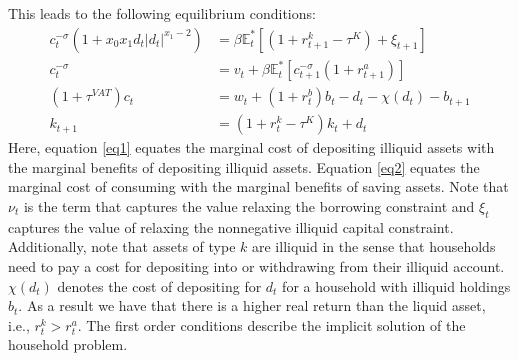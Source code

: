 This leads to the following equilibrium conditions:
\begin{align}
    c_t^{-\sigma}\left(1+x_0 x_1 d_t |d_t|^{x_1-2}\right) &=\beta \mathbb{E}_t^*\left[\left(1+r^k_{t+1}-\tau^K\right)+\xi_{t+1}\right] \label{eq1} \\
    c_t^{-\sigma} &=  v_t+\beta \mathbb{E}_t^*\left[c_{t+1}^{-\sigma}\left(1+r_{t+1}^a\right)\right] \label{eq2} \\
    (1+\tau^{VAT})c_t&=w_t+\left(1+r_t^b\right) b_t-d_t-\chi (d_t)-b_{t+1} \\
    k_{t+1}& =\left(1+r^k_t-\tau^K\right) k_t+d_t
\end{align}
Here, equation \ref{eq1} equates the marginal cost of depositing illiquid assets with the marginal benefits of depositing illiquid assets.
Equation \ref{eq2} equates the marginal cost of consuming with the marginal benefits of saving assets. Note that $\nu_t$ is the term that captures the value relaxing the borrowing constraint and $\xi_t$ captures the value of relaxing the nonnegative illiquid capital constraint. Additionally, note that assets of type $k$ are illiquid in the sense that households need to pay a cost for depositing into or withdrawing from their illiquid account. $\chi\left(d_t \right)$ denotes the cost of depositing for $d_t$ for a household with illiquid holdings $b_t$. As a result we have that there is a higher real return than the liquid asset, i.e., $r_t^k > r_t^a$. 
The first order conditions describe the implicit solution of the household problem. 